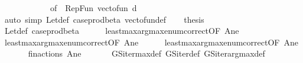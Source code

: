 \begin{isabellebody}
\ \ \ \ \isamarkupfalse%
\ {}\isanewline
\ \ \ \ \isamarkupfalse%
\ {}{\isacharbrackleft}{\kern0pt}of\ {\isacharunderscore}{\kern0pt}\ {\isachardoublequoteopen}Rep{\isacharunderscore}{\kern0pt}Fun\ {\isacharparenleft}{\kern0pt}vec{\isacharunderscore}{\kern0pt}to{\isacharunderscore}{\kern0pt}fun\ d{\isacharparenright}{\kern0pt}{\isachardoublequoteclose}{\isacharbrackright}{\kern0pt}\isanewline
\ \ \ \ \isamarkupfalse%
\ {}\isanewline
\ \ \ \ \isamarkupfalse%
\ {}\isanewline
\ \ \ \ \isamarkupfalse%
\ {}\isanewline
\ \ \ \ \isamarkupfalse%
\ {\isacharparenleft}{\kern0pt}auto\ simp{\isacharcolon}{\kern0pt}\ Let{\isacharunderscore}{\kern0pt}def\ case{\isacharunderscore}{\kern0pt}prod{\isacharunderscore}{\kern0pt}beta\ vec{\isacharunderscore}{\kern0pt}to{\isacharunderscore}{\kern0pt}fun{\isacharunderscore}{\kern0pt}def{\isacharparenright}{\kern0pt}\isanewline
\ \ \isamarkupfalse%
\ {\isacharquery}{\kern0pt}thesis\isanewline
\ \ \ \ \isamarkupfalse%
\ Let{\isacharunderscore}{\kern0pt}def\ case{\isacharunderscore}{\kern0pt}prod{\isacharunderscore}{\kern0pt}beta\isanewline
\ \ \ \ \isamarkupfalse%
\ least{\isacharunderscore}{\kern0pt}max{\isacharunderscore}{\kern0pt}arg{\isacharunderscore}{\kern0pt}max{\isacharunderscore}{\kern0pt}enum{\isacharunderscore}{\kern0pt}correct{}{\isacharbrackleft}{\kern0pt}OF\ A{\isacharunderscore}{\kern0pt}ne{\isacharbrackright}{\kern0pt}\isanewline
\ \ \ \ \isamarkupfalse%
\ least{\isacharunderscore}{\kern0pt}max{\isacharunderscore}{\kern0pt}arg{\isacharunderscore}{\kern0pt}max{\isacharunderscore}{\kern0pt}enum{\isacharunderscore}{\kern0pt}correct{}{\isacharbrackleft}{\kern0pt}OF\ A{\isacharunderscore}{\kern0pt}ne{\isacharbrackright}{\kern0pt}\isanewline
\ \ \ \ \isamarkupfalse%
\ least{\isacharunderscore}{\kern0pt}max{\isacharunderscore}{\kern0pt}arg{\isacharunderscore}{\kern0pt}max{\isacharunderscore}{\kern0pt}enum{\isacharunderscore}{\kern0pt}correct{}{\isacharbrackleft}{\kern0pt}OF\ A{\isacharunderscore}{\kern0pt}ne{\isacharbrackright}{\kern0pt}\isanewline
\ \ \ \ \isamarkupfalse%
\ {}\ fin{\isacharunderscore}{\kern0pt}actions\ A{\isacharunderscore}{\kern0pt}ne\ \isanewline
\ \ \ \ \isamarkupfalse%
\ GS{\isacharunderscore}{\kern0pt}iter{\isacharunderscore}{\kern0pt}max{\isacharunderscore}{\kern0pt}def\ GS{\isacharunderscore}{\kern0pt}iter{\isacharunderscore}{\kern0pt}def\ GS{\isacharunderscore}{\kern0pt}iter{\isacharunderscore}{\kern0pt}arg{\isacharunderscore}{\kern0pt}max{\isacharunderscore}{\kern0pt}def\ \isanewline

\end{isabellebody}
